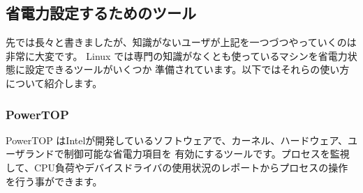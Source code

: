 \documentclass[mingoth,a4paper]{jsarticle}
\begin{document}
\subsection{省電力設定するためのツール}

先では長々と書きましたが、知識がないユーザが上記を一つづつやっていくのは非常に大変です。
Linux では専門の知識がなくとも使っているマシンを省電力状態に設定できるツールがいくつか
準備されています。以下ではそれらの使い方について紹介します。

\subsubsection{PowerTOP}

PowerTOP はIntelが開発しているソフトウェアで、カーネル、ハードウェア、ユーザランドで制御可能な省電力項目を
有効にするツールです。プロセスを監視して、CPU負荷やデバイスドライバの使用状況のレポートからプロセスの操作
を行う事ができます。
\end{document}
